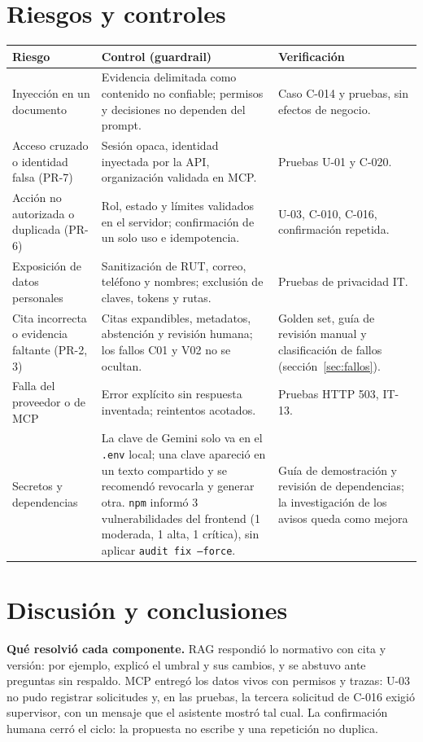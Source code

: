 \documentclass[11pt,a4paper]{article}
\newcommand{\codigo}[1]{\texttt{\small #1}}
\newcommand{\cab}{\rowcolor{azulmira!14}}
\newcommand{\tabla}{\small\rowcolors{2}{white}{grisclaro}}
\begin{document}
\section{Riesgos y controles}
\begin{center}\tabla
\begin{tabularx}{\textwidth}{@{}p{3.2cm}YY@{}}
\toprule
\cab\textbf{Riesgo} & \textbf{Control (guardrail)} & \textbf{Verificación}\\
\midrule
Inyección en un documento & Evidencia delimitada como contenido no confiable; permisos y decisiones no dependen del prompt. & Caso C-014 y pruebas, sin efectos de negocio.\\
Acceso cruzado o identidad falsa (PR-7) & Sesión opaca, identidad inyectada por la API, organización validada en MCP. & Pruebas U-01 y C-020.\\
Acción no autorizada o duplicada (PR-6) & Rol, estado y límites validados en el servidor; confirmación de un solo uso e idempotencia. & U-03, C-010, C-016, confirmación repetida.\\
Exposición de datos personales & Sanitización de RUT, correo, teléfono y nombres; exclusión de claves, tokens y rutas. & Pruebas de privacidad IT.\\
Cita incorrecta o evidencia faltante (PR-2, 3) & Citas expandibles, metadatos, abstención y revisión humana; los fallos C01 y V02 no se ocultan. & Golden set, guía de revisión manual y clasificación de fallos (sección~\ref{sec:fallos}).\\
Falla del proveedor o de MCP & Error explícito sin respuesta inventada; reintentos acotados. & Pruebas HTTP 503, IT-13.\\
Secretos y dependencias & La clave de Gemini solo va en el \codigo{.env} local; una clave apareció en un texto compartido y se recomendó revocarla y generar otra. \codigo{npm} informó 3 vulnerabilidades del frontend (1 moderada, 1 alta, 1 crítica), sin aplicar \codigo{audit fix --force}. & Guía de demostración y revisión de dependencias; la investigación de los avisos queda como mejora\\
\bottomrule
\end{tabularx}
\end{center}

\section{Discusión y conclusiones}
\textbf{Qué resolvió cada componente.} RAG respondió lo normativo con cita y versión: por ejemplo, explicó el umbral y sus cambios, y se abstuvo ante preguntas sin respaldo. MCP entregó los datos vivos con permisos y trazas: U-03 no pudo registrar solicitudes y, en las pruebas, la tercera solicitud de C-016 exigió supervisor, con un mensaje que el asistente mostró tal cual. La confirmación humana cerró el ciclo: la propuesta no escribe y una repetición no duplica.
\end{document}

